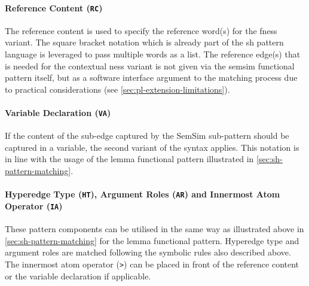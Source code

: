 \documentclass[11pt]{scrreprt}
\begin{document}
\paragraph{Reference Content (\texttt{RC})} 
The reference content is used to specify the reference word(s) for the \gls{fness} variant. The square bracket notation which is already part of the \gls{sh} pattern language is leveraged to pass multiple words as a list. The reference edge(s) that is needed for the contextual \gls{ness} variant is not given via the semsim functional pattern itself, but as a software interface argument to the matching process due to practical considerations (see \cref{sec:pl-extension-limitations}).


\paragraph{Variable Declaration (\texttt{VA})} 
If the content of the sub-edge captured by the SemSim sub-pattern should be captured in a variable, the second variant of the syntax applies. This notation is in line with the usage of the lemma functional pattern illustrated in \cref{sec:sh-pattern-matching}.


\paragraph{Hyperedge Type (\texttt{HT}),  Argument Roles (\texttt{AR}) and Innermost Atom Operator (\texttt{IA})} These pattern components can be utilised in the same way as illustrated above in \cref{sec:sh-pattern-matching} for the lemma functional pattern.
Hyperedge type and argument roles are matched following the symbolic rules also described above. The innermost atom operator (\texttt{>}) can be placed in front of the reference content or the variable declaration if applicable.


\end{document}
